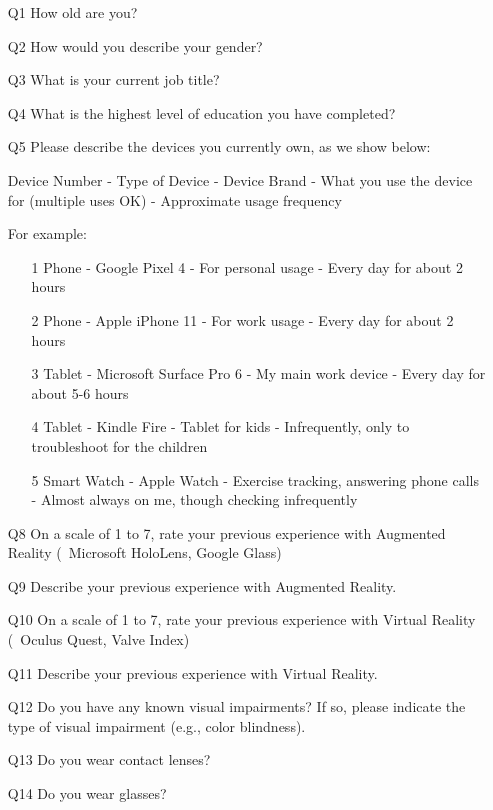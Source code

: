 \begin{enumerate}
\item[Q1] How old are you?
\item[Q2] How would you describe your gender?
\item[Q3] What is your current job title?
\item[Q4] What is the highest level of education you have completed?
\item[Q5] Please describe the devices you currently own, as we show below:

Device Number - Type of Device - Device Brand - What you use the device for (multiple uses OK) - Approximate usage frequency

For example:
\begin{enumerate}
\item[1] Phone - Google Pixel 4 - For personal usage - Every day for about 2 hours

\item[2] Phone - Apple iPhone 11 - For work usage - Every day for about 2 hours

\item[3] Tablet - Microsoft Surface Pro 6 - My main work device - Every day for about 5-6 hours

\item[4] Tablet - Kindle Fire - Tablet for kids - Infrequently, only to troubleshoot for the children

\item[5] Smart Watch - Apple Watch - Exercise tracking, answering phone calls - Almost always on me, though checking infrequently
\end{enumerate}

\item[Q8] On a scale of 1 to 7, rate your previous experience with Augmented Reality (\eg~Microsoft HoloLens, Google Glass)

\item[Q9] Describe your previous experience with Augmented Reality. 
\item[Q10] On a scale of 1 to 7, rate your previous experience with Virtual Reality (\eg~Oculus Quest, Valve Index)

\item[Q11] Describe your previous experience with Virtual Reality. 

\item[Q12] Do you have any known visual impairments? If so, please indicate the type of visual impairment (e.g., color blindness). 
\item[Q13] Do you wear contact lenses?
\item[Q14] Do you wear glasses?
\end{enumerate}

